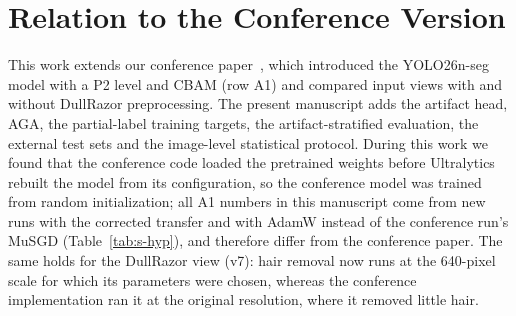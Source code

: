 \documentclass[10pt,a4paper]{article}
\begin{document}
\section{Relation to the Conference Version}\label{sec:s-conference}
This work extends our conference paper~\cite{iceeis2026own}, which introduced the YOLO26n-seg model with a P2 level and CBAM (row A1) and compared input views with and without DullRazor preprocessing. The present manuscript adds the artifact head, AGA, the partial-label training targets, the artifact-stratified evaluation, the external test sets and the image-level statistical protocol. During this work we found that the conference code loaded the pretrained weights before Ultralytics rebuilt the model from its configuration, so the conference model was trained from random initialization; all A1 numbers in this manuscript come from new runs with the corrected transfer and with AdamW instead of the conference run's MuSGD (Table~\ref{tab:s-hyp}), and therefore differ from the conference paper. The same holds for the DullRazor view (v7): hair removal now runs at the 640-pixel scale for which its parameters were chosen, whereas the conference implementation ran it at the original resolution, where it removed little hair. 

\clearpage
\begingroup
\small


\endgroup
\end{document}

